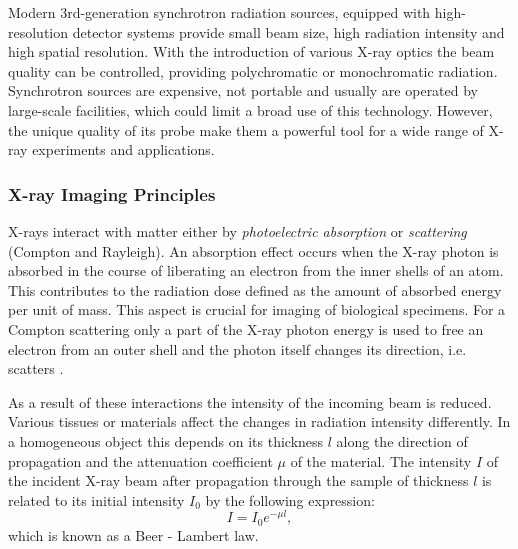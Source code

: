 Modern 3rd-generation synchrotron radiation sources, equipped with high-resolution detector systems provide small beam size, high radiation intensity and high spatial resolution.
With the introduction of various X-ray optics the beam quality can be controlled, providing polychromatic or monochromatic radiation.
Synchrotron sources are expensive, not portable and usually are operated by large-scale facilities, which could limit a broad use of this technology. However, the unique quality of its probe make them a powerful tool for a wide range of X-ray experiments and applications.


\subsubsection*{X-ray Imaging Principles}
\label{xray_imaging_prnciples}

X-rays interact with matter either by \textit{photoelectric absorption} or \textit{scattering} (Compton and Rayleigh).  An absorption effect occurs when the X-ray photon is absorbed  in the course of liberating an electron from the inner shells of an atom. This contributes to the radiation dose defined as the amount of absorbed energy per unit of mass. This aspect is crucial for imaging of biological specimens. For a Compton scattering only a part of the X-ray photon  energy is used to free an electron  from an outer shell and the photon itself changes its direction, i.e. scatters \cite{Dougherty09}.
 
As a result of these interactions the intensity of the incoming beam is reduced. Various tissues or materials affect the changes in radiation intensity differently. In a homogeneous object this depends on its thickness $l$ along the direction of propagation and the attenuation coefficient $\mu$ of the material. The intensity $I$ of the incident X-ray beam after propagation through the sample of thickness $l$ is related to its initial intensity $I_0$ by the following expression:
$$I = I_0 e^{- \mu l},$$
which is known as a Beer - Lambert law.
    


